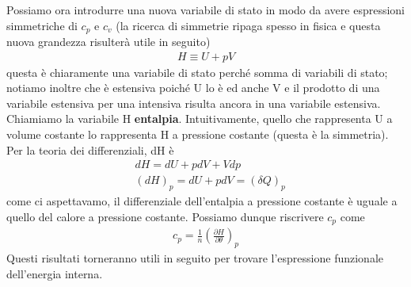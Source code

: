 \documentclass[
10pt, %
a4paper, %
oneside, %
headinclude,footinclude, %
BCOR5mm, %
]{scrartcl}
\begin{document}
Possiamo ora introdurre una nuova variabile di stato in modo da avere espressioni simmetriche di \(c_p\) e \(c_v\) (la ricerca di simmetrie ripaga spesso in fisica e questa nuova grandezza risulterà utile in seguito)
\begin{align*} 
	H \equiv U + pV
\end{align*} 
questa è chiaramente una variabile di stato perché somma di variabili di stato; notiamo inoltre che è estensiva poiché U lo è ed anche V e il prodotto di una variabile estensiva per una intensiva risulta ancora in una variabile estensiva. Chiamiamo la variabile H \textbf{entalpia}. Intuitivamente, quello che rappresenta U a volume costante lo rappresenta H a pressione costante (questa è la simmetria). Per la teoria dei differenziali, dH è
\begin{align*}  
	&dH = dU + pdV + Vdp \\
	&(dH)_p = dU + pdV = (\delta Q)_p
\end{align*}  
come ci aspettavamo, il differenziale dell'entalpia a pressione costante è uguale a quello del calore a pressione costante. Possiamo dunque riscrivere \(c_p\) come
\begin{align*}  
	c_p = \frac{1}{n} \left(\frac{\partial H}{\partial \theta}\right)_p
\end{align*}  
Questi risultati torneranno utili in seguito per trovare l'espressione funzionale dell'energia interna. 
\end{document}
